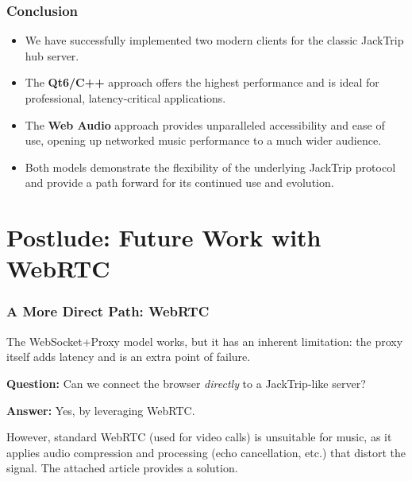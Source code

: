 \documentclass{beamer}
\begin{document}
\begin{frame}
\frametitle{Conclusion}
\begin{itemize}
    \item We have successfully implemented two modern clients for the classic JackTrip hub server.
    \item The \textbf{Qt6/C++} approach offers the highest performance and is ideal for professional, latency-critical applications.
    \item The \textbf{Web Audio} approach provides unparalleled accessibility and ease of use, opening up networked music performance to a much wider audience.
    \item Both models demonstrate the flexibility of the underlying JackTrip protocol and provide a path forward for its continued use and evolution.
\end{itemize}
\end{frame}

\section*{Postlude: Future Work with WebRTC}

\begin{frame}
\frametitle{A More Direct Path: WebRTC}
The WebSocket+Proxy model works, but it has an inherent limitation: the proxy itself adds latency and is an extra point of failure.
\vspace{0.5cm}

\textbf{Question:} Can we connect the browser \textit{directly} to a JackTrip-like server?
\vspace{0.5cm}

\textbf{Answer:} Yes, by leveraging \alert{WebRTC}.
\vspace{0.5cm}

However, standard WebRTC (used for video calls) is unsuitable for music, as it applies audio compression and processing (echo cancellation, etc.) that distort the signal. The attached article provides a solution.
\end{frame}
\end{document}
